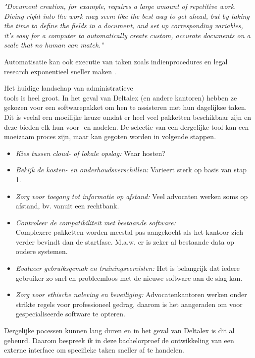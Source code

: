 \begin{displayquote}
	\textit{"Document creation, for example, requires a large amount of repetitive work. Diving right into the work may seem like the best way to get ahead, but by taking the time to define the fields in a document, and set up corresponding variables, it’s easy for a computer to automatically create custom, accurate documents on a scale that no human can match."}
	\autocite{ThomsonReuters2023}
\end{displayquote}


Automatisatie kan ook executie van taken zoals indienprocedures en legal research exponentieel sneller maken \autocite{Aston2023}.

Het huidige landschap van administratieve\\ tools is heel groot. In het geval van Deltalex (en andere kantoren) hebben ze gekozen voor een softwarepakket om hen te assisteren met hun dagelijkse taken. Dit is veelal een moeilijke keuze omdat er heel veel pakketten beschikbaar zijn en deze bieden elk hun voor- en nadelen. De selectie van een dergelijke tool kan een moeizaam proces zijn, maar kan gegoten worden in volgende stappen.

\begin{itemize}
	\item \emph{Kies tussen cloud- of lokale opslag:} Waar hosten?
	\item \emph{Bekijk de kosten- en onderhoudsverschillen:} Varieert sterk op basis van stap 1.
	\item \emph{Zorg voor toegang tot informatie op afstand:} Veel advocaten werken soms op afstand, bv. vanuit een rechtbank.
	\item \emph{Controleer de compatibiliteit met bestaande software:}\\ Complexere pakketten worden meestal pas aangekocht als het kantoor zich verder bevindt dan de startfase. M.a.w. er is zeker al bestaande data op oudere systemen.
	\item \emph{Evalueer gebruiksgemak en trainingsvereisten:} Het is belangrijk dat iedere gebruiker zo snel en probleemloos met de nieuwe software aan de slag kan.
	\item \emph{Zorg voor ethische naleving en beveiliging:} Advocatenkantoren werken onder strikte regels voor professioneel gedrag, daarom is het aangeraden om voor gespecialiseerde software te opteren. \autocite{Clio2023}
\end{itemize}

Dergelijke pocessen kunnen lang duren en in het geval van Deltalex is dit al gebeurd. Daarom bespreek ik in deze bachelorproef de ontwikkeling van een externe interface om specifieke taken sneller af te handelen.

